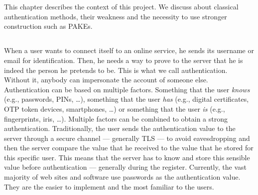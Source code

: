﻿\documentclass[../report.tex]{subfiles}
\begin{document}

\chapter{}
This chapter describes the context of this project. We discuss about classical authentication methods, their weakness and the necessity to use stronger construction such as PAKEs.


\section{}
\paragraph{}
When a user wants to connect itself to an online service, he sends its username or email for identification. Then, he needs a way to prove to the server that he is indeed the person he pretends to be. This is what we call authentication. Without it, anybody can impersonate the account of someone else.
Authentication can be based on multiple factors. Something that the user \emph{knows} (e.g., passwords, PINs, …), something that the user \emph{has} (e.g., digital certificates, OTP token devices, smartphones, …) or something that the user \emph{is} (e.g., fingerprints, iris, …). Multiple factors can be combined to obtain a strong authentication.
Traditionally, the user sends the authentication value to the server through a secure channel --- generally TLS --- to avoid eavesdropping and then the server compare the value that he received to the value that he stored for this specific user.
This means that the server has to know and store this sensible value before authentication --- generally during the register.
Currently, the vast majority of web sites and software use passwords as the authentication value. They are the easier to implement and the most familiar to the users.
\end{document}
